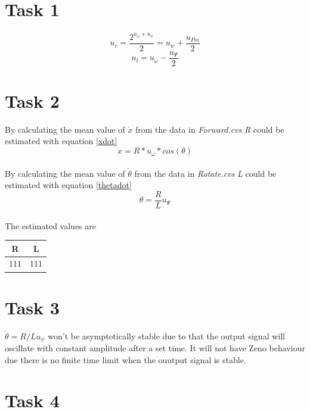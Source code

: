 \documentclass[a4paper,12pt,oneside,onecolumn]{article} %
\begin{document}
\section*{Task 1}

\begin{equation}
u_r = \frac{2^{u_{\omega} + u_{\psi}}}{2} = u_w + \frac{u_{Psi}}{2}
\end{equation}
\begin{equation}
u_l = u_\omega - \frac{u_\Psi}{2}
\end{equation}

\section*{Task 2}

By calculating the mean value of $\dot{x}$ from the data in \emph{Forward.cvs} \emph{R} could be estimated with equation \eqref{xdot}
\begin{equation}
\dot{x} = R*u_\omega*cos(\theta) \label{xdot}
\end{equation}
\\
By calculating the mean value of $\dot{\theta}$ from the data in \emph{Rotate.cvs} \emph{L} could be estimated with equation \eqref{thetadot}
\begin{equation}
\dot{\theta} = \frac{R}{L}u_\Psi\label{thetadot}
\end{equation}
\\
The estimated values are
\begin{center}
	\begin{tabular}{| c | c |}
	\hline
	R & L \\ \hline
	111 & 111 \\ \hline
	
	\end{tabular}
\end{center}

\section*{Task 3}

$\dot{\theta} = R/L u_\psi$ won't be asymptotically stable due to that the output signal will oscillate with constant amplitude after a set time. It will not have Zeno behaviour due there is no finite time limit when the ouutput signal is stable. 


\section*{Task 4}
\end{document}
